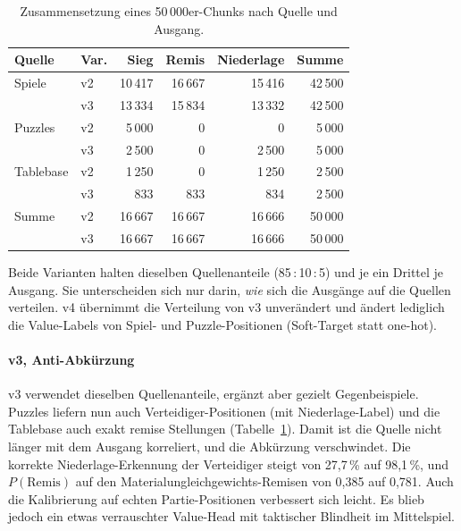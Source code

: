 \documentclass[
  a4paper, 12pt,
  parskip=half,
  headings=small,
  bibliography=totoc
]{scrartcl}
\begin{document}
\begin{table}[htbp]
  \centering
  \begin{tabular}{llrrrr}
    \toprule
    Quelle & Var. & Sieg & Remis & Niederlage & Summe \\
    \midrule
    Spiele    & v2 & 10\,417 & 16\,667 & 15\,416 & 42\,500 \\
              & v3 & 13\,334 & 15\,834 & 13\,332 & 42\,500 \\
    \addlinespace
    Puzzles   & v2 &  5\,000 &      0 &      0 &  5\,000 \\
              & v3 &  2\,500 &      0 &  2\,500 &  5\,000 \\
    \addlinespace
    Tablebase & v2 &  1\,250 &      0 &  1\,250 &  2\,500 \\
              & v3 &    833 &    833 &    834 &  2\,500 \\
    \midrule
    Summe     & v2 & 16\,667 & 16\,667 & 16\,666 & 50\,000 \\
              & v3 & 16\,667 & 16\,667 & 16\,666 & 50\,000 \\
    \bottomrule
  \end{tabular}
  \caption{Zusammensetzung eines 50\,000er-Chunks nach Quelle und Ausgang.}
  \label{tab:sl-chunk-mix}
\end{table}

Beide Varianten halten dieselben Quellenanteile (85\,:\,10\,:\,5) und je ein Drittel
je Ausgang. Sie unterscheiden sich nur darin, \emph{wie} sich die Ausgänge auf die
Quellen verteilen. v4 übernimmt die Verteilung von v3 unverändert und ändert
lediglich die Value-Labels von Spiel- und Puzzle-Positionen (Soft-Target statt
one-hot).

\paragraph{v3, Anti-Abkürzung}
v3 verwendet dieselben Quellenanteile, ergänzt aber gezielt Gegenbeispiele.
Puzzles liefern nun auch Verteidiger-Positionen (mit Niederlage-Label) und die
Tablebase auch exakt remise Stellungen (Tabelle~\ref{tab:sl-chunk-mix}). Damit ist
die Quelle nicht länger mit dem Ausgang korreliert, und die Abkürzung
verschwindet. Die korrekte Niederlage-Erkennung der Verteidiger steigt von
27{,}7\,\% auf 98{,}1\,\%, und \(P(\text{Remis})\) auf den
Materialungleichgewichts-Remisen von 0{,}385 auf 0{,}781. Auch die Kalibrierung auf
echten Partie-Positionen verbessert sich leicht. Es blieb jedoch ein etwas verrauschter Value-Head mit
taktischer Blindheit im Mittelspiel.
\end{document}
